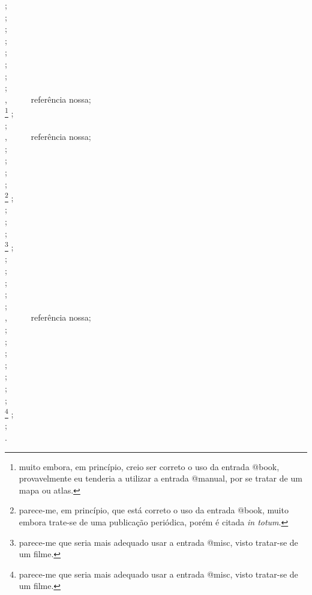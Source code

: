\begin{apendicesenv}
{    \cite{lima1985} ;\\
    \cite{lucci1994} ;\\
    \cite{lujan1993} ;\\
    \cite{maia1995} ;\\
    \cite{makau1962} ;\\
    \cite{mandino1994} ;\\
    \cite{marcondes1993} ;\\
    \cite{marques1993} ;\\
    \cite{Maturana2003} , \ \ \ \ \ referência nossa;\\
    \cite{michalany1981}\footnote{muito embora, em princípio, creio ser correto o uso da entrada {\ttfamily @book}, provavelmente eu tenderia a utilizar a entrada {\ttfamily @manual}, por se tratar de um mapa ou atlas.}  ;\\
    \cite{miglori1993} ;\\
    \cite{Mittelbach2004} , \ \ \ \ \ referência nossa;\\
    \cite{moore1960} ;\\
    \cite{wmoore1960} ;\\
    \cite{passos1995} ;\\
    \cite{pastro1993} ;\\
    \cite{paulista1941}\footnote{parece-me, em princípio, que está correto o uso da entrada {\ttfamily @book}, muito embora trate-se de uma publicação periódica, porém é citada \textit{in totum}.}  ;\\
    \cite{pedrosa1995} ;\\
    \cite{pelosi1993} ;\\
    \cite{piaget1980} ;\\
    \cite{riofilme1998}\footnote{parece-me que seria mais adequado usar a entrada {\ttfamily @misc}, visto tratar-se de um filme.} ;\\
    \cite{rodrigues1994} ;\\
    \cite{ruch1926} ;\\
    \cite{saadi1994} ;\\
    \cite{schaum1956} ;\\
    \cite{silva1996} ;\\
    \cite{Silva2000} , \ \ \ \ \ referência nossa;\\
    \cite{swokowski1994} ;\\
    \cite{tabak1993} ;\\
    \cite{tamandare1993} ;\\
    \cite{torelly1991} ;\\
    \cite{tourinho1994} ;\\
    \cite{tringali1994} ;\\
    \cite{urani1994} ;\\
    \cite{warner1991}\footnote{parece-me que seria mais adequado usar a entrada {\ttfamily @misc}, visto tratar-se de um filme.} ;\\
    \cite{zani1995} ;\\
    \cite{zilberman1998}.\\
}




\end{apendicesenv}
